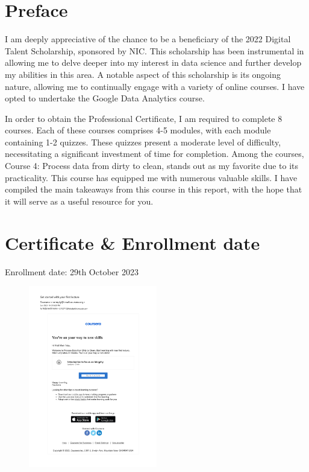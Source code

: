 \documentclass[]{article}
\begin{document}
\setlength{\parskip}{.7em}
\tableofcontents
\newpage

\setlength{\parskip}{.5em}
\newpage


\section{Preface}
I am deeply appreciative of the chance to be a beneficiary of the 2022 Digital Talent Scholarship, sponsored by NIC. This scholarship has been instrumental in allowing me to delve deeper into my interest in data science and further develop my abilities in this area. A notable aspect of this scholarship is its ongoing nature, allowing me to continually engage with a variety of online courses. I have opted to undertake the Google Data Analytics course.

In order to obtain the Professional Certificate, I am required to complete 8 courses. Each of these courses comprises 4-5 modules, with each module containing 1-2 quizzes. These quizzes present a moderate level of difficulty, necessitating a significant investment of time for completion. Among the courses, Course 4: Process data from dirty to clean, stands out as my favorite due to its practicality. This course has equipped me with numerous valuable skills. I have compiled the main takeaways from this course in this report, with the hope that it will serve as a useful resource for you.
\section{Certificate \& Enrollment date}

Enrollment date: 29th October 2023

\begin{figure}[H]
  \centering
  \includegraphics[width=0.5\textwidth]{certs/mail.pdf}
\end{figure}
\end{document}
